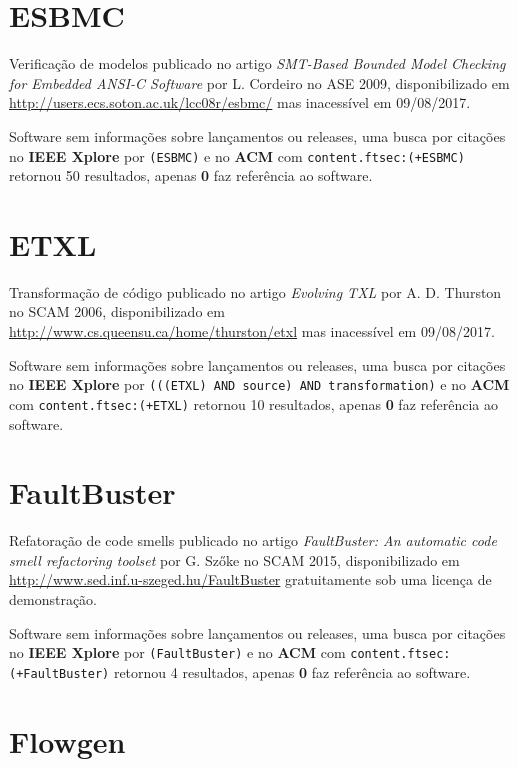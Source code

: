 \section{ESBMC}

Verificação de modelos
publicado no artigo {\it SMT-Based Bounded Model Checking for Embedded ANSI-C Software}
por L. Cordeiro
no ASE 2009,
disponibilizado em \url{http://users.ecs.soton.ac.uk/lcc08r/esbmc/}
mas inacessível em 09/08/2017.

Software sem informações sobre lançamentos ou releases,
uma busca por citações no {\bf IEEE Xplore} por
\texttt{(ESBMC)}
e no {\bf ACM} com
\texttt{content.ftsec:(+ESBMC)}
retornou
50 resultados, apenas
{\bf 0} faz referência ao software.



\section{ETXL}

Transformação de código
publicado no artigo {\it Evolving TXL}
por A. D. Thurston
no SCAM 2006,
disponibilizado em \url{http://www.cs.queensu.ca/home/thurston/etxl}
mas inacessível em 09/08/2017.

Software sem informações sobre lançamentos ou releases,
uma busca por citações no {\bf IEEE Xplore} por
\texttt{(((ETXL) AND source) AND transformation)}
e no {\bf ACM} com
\texttt{content.ftsec:(+ETXL)}
retornou
10 resultados, apenas
{\bf 0} faz referência ao software.



\section{FaultBuster}

Refatoração de code smells
publicado no artigo {\it FaultBuster: An automatic code smell refactoring toolset}
por G. Szőke
no SCAM 2015,
disponibilizado em \url{http://www.sed.inf.u-szeged.hu/FaultBuster}
gratuitamente
sob uma licença de demonstração.

Software sem informações sobre lançamentos ou releases,
uma busca por citações no {\bf IEEE Xplore} por
\texttt{(FaultBuster)}
e no {\bf ACM} com
\texttt{content.ftsec:(+FaultBuster)}
retornou
4 resultados, apenas
{\bf 0} faz referência ao software.



\section{Flowgen}

